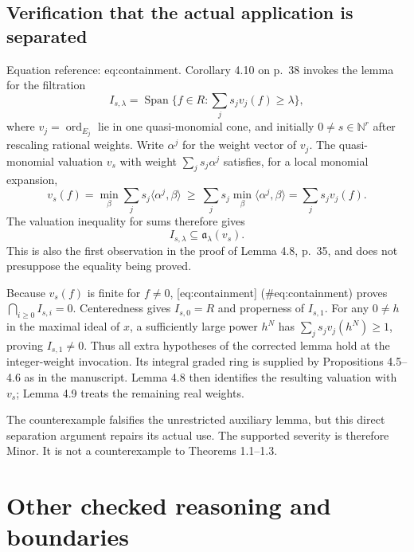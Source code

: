 \documentclass[10pt]{article}
\begin{document}
\subsection*{Verification that the actual application is separated}
Equation reference: eq:containment. Corollary 4.10 on p. 38 invokes the lemma for the filtration \[I_{s,\lambda}
 =\operatorname{Span}\{f\in R:\textstyle\sum_j s_jv_j(f)\geq\lambda\},
 \tag{4.3 of the manuscript}\] where \(v_j=\operatorname{ord}_{E_j}\) lie in one quasi-monomial cone, and initially \(0\ne s\in\mathbb N^r\) after rescaling rational weights. Write \(\alpha^j\) for the weight vector of \(v_j\). The quasi-monomial valuation \(v_s\) with weight \(\sum_j s_j\alpha^j\) satisfies, for a local monomial expansion, \[v_s(f)
 =\min_\beta\sum_j s_j\langle\alpha^j,\beta\rangle
 \ \geq\ \sum_j s_j\min_\beta\langle\alpha^j,\beta\rangle
 =\sum_j s_jv_j(f).\] The valuation inequality for sums therefore gives \[
 I_{s,\lambda}\subseteq\mathfrak a_\lambda(v_s).\] This is also the first observation in the proof of Lemma 4.8, p. 35, and does not presuppose the equality being proved.\par
Because \(v_s(f)\) is finite for \(f\ne0\), [eq:containment] (\#eq:containment) proves \(\bigcap_{i\geq0}I_{s,i}=0\). Centeredness gives \(I_{s,0}=R\) and properness of \(I_{s,1}\). For any \(0\ne h\) in the maximal ideal of \(x\), a sufficiently large power \(h^N\) has \(\sum_j s_jv_j(h^N)\geq1\), proving \(I_{s,1}\ne0\). Thus all extra hypotheses of the corrected lemma hold at the integer-weight invocation. Its integral graded ring is supplied by Propositions 4.5–4.6 as in the manuscript. Lemma 4.8 then identifies the resulting valuation with \(v_s\); Lemma 4.9 treats the remaining real weights.\par
The counterexample falsifies the unrestricted auxiliary lemma, but this direct separation argument repairs its actual use. The supported severity is therefore Minor. It is not a counterexample to Theorems 1.1–1.3.\par
\section*{Other checked reasoning and boundaries}
\end{document}

